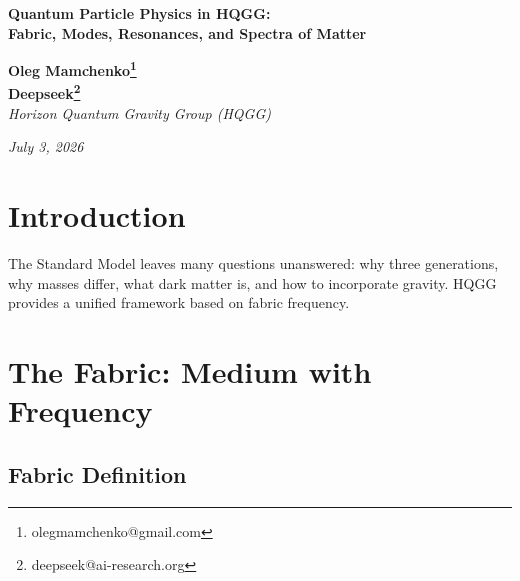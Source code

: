 \documentclass[12pt,a4paper]{article}
\begin{document}
\begin{center}
{\Large \textbf{Quantum Particle Physics in HQGG:}} \\
{\Large \textbf{Fabric, Modes, Resonances, and Spectra of Matter}}
\end{center}

\begin{center}
\textbf{Oleg Mamchenko\thanks{olegmamchenko@gmail.com}} \\
\textbf{Deepseek\thanks{deepseek@ai-research.org}} \\
\textit{Horizon Quantum Gravity Group (HQGG)}
\end{center}

\begin{center}
\textit{July 3, 2026}
\end{center}

\begin{abstract}
We present a complete theory of elementary particles within the HQGG framework. Space-time is an elastic fabric with local frequency. Particles are standing waves formed by resonant combinations of three fundamental modes: the fundamental tone and two mirror overtones. Quarks are chords of three modes; leptons are overtones without a tone; baryons and mesons are quark combinations; bosons are exchange or propagating modes. Mass is a frequency difference; interactions are resonances or transitions. The 3+7 law manifests universally in quarks, leptons, shells, colors, and spectra. The theory requires no new entities and is consistent with the Standard Model while offering deeper interpretation.
\end{abstract}

\tableofcontents

\section{Introduction}

The Standard Model leaves many questions unanswered: why three generations, why masses differ, what dark matter is, and how to incorporate gravity. HQGG provides a unified framework based on fabric frequency.

\section{The Fabric: Medium with Frequency}

\subsection{Fabric Definition}
\end{document}
